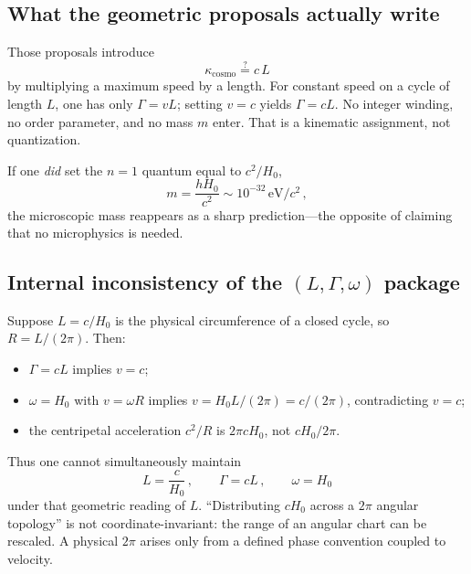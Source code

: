 \documentclass[aps,prd,reprint,superscriptaddress,nofootinbib,floatfix,showkeys]{revtex4-2}
\newcommand{\Hzero}{H_{0}}
\begin{document}
\subsection{What the geometric proposals actually write}

Those proposals introduce
\begin{equation}
  \kappa_{\mathrm{cosmo}} \stackrel{?}{=} c\,L
  \label{eq:fake-kappa}
\end{equation}
by multiplying a maximum speed by a length.  For constant speed on a cycle of
length \(L\), one has only \(\Gamma=vL\); setting \(v=c\) yields \(\Gamma=cL\).
No integer winding, no order parameter, and no mass \(m\) enter.  That is a
kinematic assignment, not quantization.

If one \emph{did} set the \(n=1\) quantum equal to \(c^{2}/\Hzero\),
\begin{equation}
  m = \frac{h\Hzero}{c^{2}}
  \sim 10^{-32}\,\mathrm{eV}/c^{2}\,,
  \label{eq:mass-pred}
\end{equation}
the microscopic mass reappears as a sharp prediction---the opposite of claiming
that no microphysics is needed.

\subsection{Internal inconsistency of the \texorpdfstring{\((L,\Gamma,\omega)\)}{(L, Gamma, omega)} package}

Suppose \(L=c/\Hzero\) is the physical circumference of a closed cycle, so
\(R=L/(2\pi)\).  Then:
\begin{itemize}
\item \(\Gamma=cL\) implies \(v=c\);
\item \(\omega=\Hzero\) with \(v=\omega R\) implies
  \(v=\Hzero L/(2\pi)=c/(2\pi)\), contradicting \(v=c\);
\item the centripetal acceleration \(c^{2}/R\) is \(2\pi c\Hzero\), not
  \(c\Hzero/2\pi\).
\end{itemize}
Thus one cannot simultaneously maintain
\begin{equation}
  L=\frac{c}{\Hzero}\,,
  \qquad
  \Gamma=cL\,,
  \qquad
  \omega=\Hzero
  \label{eq:inconsistent}
\end{equation}
under that geometric reading of \(L\).  ``Distributing \(c\Hzero\) across a
\(2\pi\) angular topology'' is not coordinate-invariant: the range of an
angular chart can be rescaled.  A physical \(2\pi\) arises only from a defined
phase convention coupled to velocity.
\end{document}
